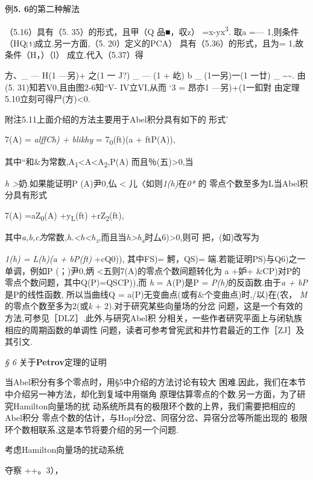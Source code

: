 \documentclass{article}
\begin{document}
例\textbf{5. 6}的第二种解法

（5.16）具有（5. 35）的形式，且甲（Q 品■，収z）
=x-yx\textsuperscript{3}. 取a =--- 1,则条件（HQ⑴成立.另一方面,（5.
20）定义的PCA） 具有（5.36）的形式，且为= 1,故条件（H，）（l）
成立.代入（5.37）得

方、\_ {--- H(1 ---另)+ 之(1 一 J?)} \_ {--- (1 + 屹)} b \_ (1一另)一(1
一廿) \_ \textasciitilde{}\textasciitilde{}. 由(5.
31)知若V0,且由图2-6知``V- IV立VI,从而 `3 = 昂亦1 ---另)+(1一釦對
由定理5.10立刻可得尸(方)\textless{}0.

附注5.11上面介绍的方法主要用于Abel积分具有如下的 形式'

7(A) = \emph{alffCh) + blikhy} = 7\textsubscript{0}(ft)(a + ftP(A)),

其中``和\&为常数,A\textsubscript{1}\textless{}A\textless{}A\textsubscript{2},P(A)
而且％(五)\textgreater{}0,当

\emph{h \textgreater{}}奶.如果能证明P (A)尹0,仏 \textless{}
儿〈如则\emph{1(h)}在\emph{0*} 的 零点个数至多为L当Abel积分具有形式

7(A) =aZ\textsubscript{0}(A) +y\textsubscript{L}(ft)
+rZ\textsubscript{2}(ft),

其中\emph{a,b,c为}常数\emph{,h.\textless{}h\textless{}h\textsubscript{z},}而且当\emph{h\textgreater{}h\textsubscript{x}}时厶6)\textgreater{}0,则可
把，(如)改写为

\emph{1(h) = L(h)(a + bP(ft)} +cQ0)), 其中FS)= 鰐，QS)=
端.若能证明PS)与Q6)之一 单调，例如P (；)尹0,炳
\textless{}五则7(A)的零点个数间题转化为 a +妒+
\&CP)对P的零点个数问题，其中Q(P)=QSCP)),而 \emph{h} = A(P)是P =
\emph{P(h)}的反函数.由于\emph{a + bP}是P的线性函数, 所以当曲线Q =
a(P)无变曲点(或有\&个变曲点)时,/以)在(农，
\emph{M}的零点个数至多为2(或\emph{k} + 2).对于研究某些向量场的分岔
问题，这是一个有效的方法,可参见［DLZ］.此外,与研究Abel积
分相关，一些作者研究平面上与闭轨族相应的周期函数的单调性
问题，读者可参考曾宪武和井竹君最近的工作［ZJ］及其引文.

\protect\hypertarget{bookmark100}{}{}\emph{§ 6}
关于\textbf{Petrov}定理的证明

当Abel积分有多个零点时，用§5中介绍的方法讨论有较大
困难.因此，我们在本节中介绍另一神方法，却化到复域中用嶺角
原理估算零点的个数.另一方面，为了研究Hamilton向量场的扰
动系统所具有的极限环个数的上界，我们需要把相应的Abel积分
零点个数的估计，与Hopf分岔、同宿分岔、异宿分岔等所能出现的
极限环个数相联系,这是本节将要介绍的另一个问题.

考虑Hamilton向量场的扰动系统

夺察 ++。3），
\end{document}
